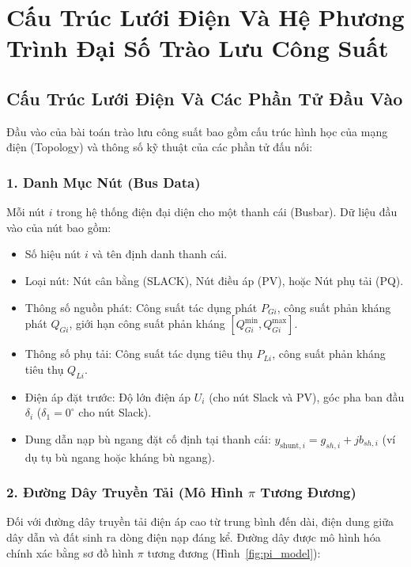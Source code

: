 \documentclass[12pt,a4paper,oneside]{report}
\begin{document}
\chapter{Cấu Trúc Lưới Điện Và Hệ Phương Trình Đại Số Trào Lưu Công Suất}

\section{Cấu Trúc Lưới Điện Và Các Phần Tử Đầu Vào}
Đầu vào của bài toán trào lưu công suất bao gồm cấu trúc hình học của mạng điện (Topology) và thông số kỹ thuật của các phần tử đấu nối:

\subsection{1. Danh Mục Nút (Bus Data)}
Mỗi nút $i$ trong hệ thống điện đại diện cho một thanh cái (Busbar). Dữ liệu đầu vào của nút bao gồm:
\begin{itemize}
    \item Số hiệu nút $i$ và tên định danh thanh cái.
    \item Loại nút: Nút cân bằng (SLACK), Nút điều áp (PV), hoặc Nút phụ tải (PQ).
    \item Thông số nguồn phát: Công suất tác dụng phát $P_{Gi}$, công suất phản kháng phát $Q_{Gi}$, giới hạn công suất phản kháng $[Q_{Gi}^{\min}, Q_{Gi}^{\max}]$.
    \item Thông số phụ tải: Công suất tác dụng tiêu thụ $P_{Li}$, công suất phản kháng tiêu thụ $Q_{Li}$.
    \item Điện áp đặt trước: Độ lớn điện áp $U_i$ (cho nút Slack và PV), góc pha ban đầu $\delta_i$ ($\delta_1 = 0^\circ$ cho nút Slack).
    \item Dung dẫn nạp bù ngang đặt cố định tại thanh cái: $y_{\text{shunt}, i} = g_{sh, i} + j b_{sh, i}$ (ví dụ tụ bù ngang hoặc kháng bù ngang).
\end{itemize}

\subsection{2. Đường Dây Truyền Tải (Mô Hình $\pi$ Tương Đương)}
Đối với đường dây truyền tải điện áp cao từ trung bình đến dài, điện dung giữa dây dẫn và đất sinh ra dòng điện nạp đáng kể. Đường dây được mô hình hóa chính xác bằng sơ đồ hình $\pi$ tương đương (Hình~\ref{fig:pi_model}):
\end{document}
